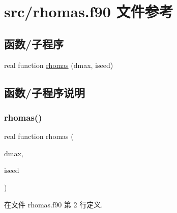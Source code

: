 \hypertarget{rhomas_8f90}{}\section{src/rhomas.f90 文件参考}
\label{rhomas_8f90}
\subsection*{函数/子程序}
\begin{DoxyCompactItemize}
\item 
real function \mbox{\hyperlink{rhomas_8f90_a0eb545f9d6dbd369cb26a82f46ea7f02}{rhomas}} (dmax, iseed)
\end{DoxyCompactItemize}


\subsection{函数/子程序说明}
\mbox{\label{rhomas_8f90_a0eb545f9d6dbd369cb26a82f46ea7f02}} 
\subsubsection{\texorpdfstring{rhomas()}{rhomas()}}
{\footnotesize\ttfamily real function rhomas (\begin{DoxyParamCaption}\item[{}]{dmax,  }\item[{}]{iseed }\end{DoxyParamCaption})}



在文件 rhomas.\+f90 第 2 行定义.

